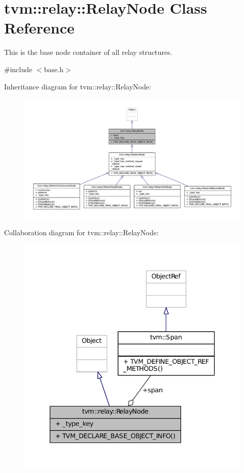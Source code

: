 \hypertarget{classtvm_1_1relay_1_1RelayNode}{}\section{tvm\+:\+:relay\+:\+:Relay\+Node Class Reference}
\label{classtvm_1_1relay_1_1RelayNode}


This is the base node container of all relay structures.  




{\ttfamily \#include $<$base.\+h$>$}



Inheritance diagram for tvm\+:\+:relay\+:\+:Relay\+Node\+:
\nopagebreak
\begin{figure}[H]
\begin{center}
\leavevmode
\includegraphics[width=350pt]{classtvm_1_1relay_1_1RelayNode__inherit__graph}
\end{center}
\end{figure}


Collaboration diagram for tvm\+:\+:relay\+:\+:Relay\+Node\+:
\nopagebreak
\begin{figure}[H]
\begin{center}
\leavevmode
\includegraphics[width=336pt]{classtvm_1_1relay_1_1RelayNode__coll__graph}
\end{center}
\end{figure}
